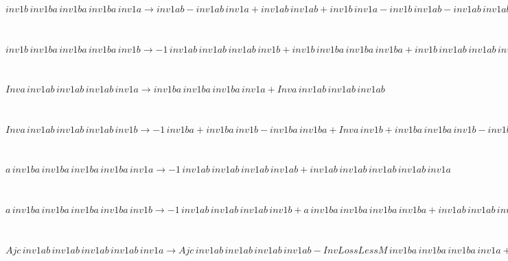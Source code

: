 \begin{minipage}{6in}
$
inv1b\,
 inv1ba\,
 inv1ba\,
 inv1ba\,
 inv1a\rightarrow inv1ab - inv1ab\,
 inv1a + inv1ab\,
 inv1ab + inv1b\,
 inv1a - inv1b\,
 inv1ab - inv1ab\,
 inv1ab\,
 inv1a + inv1ab\,
 inv1ab\,
 inv1ab + inv1b\,
 inv1ab\,
 inv1a - inv1b\,
 inv1ab\,
 inv1ab - inv1ab\,
 inv1ab\,
 inv1ab\,
 inv1a + inv1b\,
 inv1ab\,
 inv1ab\,
 inv1a - inv1b\,
 inv1ab\,
 inv1ab\,
 inv1ab + inv1b\,
 inv1ab\,
 inv1ab\,
 inv1ab\,
 inv1a
$
\end{minipage}\medskip \\
\begin{minipage}{6in}
$
inv1b\,
 inv1ba\,
 inv1ba\,
 inv1ba\,
 inv1b\rightarrow -1\,
 inv1ab\,
 inv1ab\,
 inv1ab\,
 inv1b + inv1b\,
 inv1ba\,
 inv1ba\,
 inv1ba + inv1b\,
 inv1ab\,
 inv1ab\,
 inv1ab\,
 inv1b
$
\end{minipage}\medskip \\
\begin{minipage}{6in}
$
Inva\,
 inv1ab\,
 inv1ab\,
 inv1ab\,
 inv1a\rightarrow inv1ba\,
 inv1ba\,
 inv1ba\,
 inv1a + Inva\,
 inv1ab\,
 inv1ab\,
 inv1ab
$
\end{minipage}\medskip \\
\begin{minipage}{6in}
$
Inva\,
 inv1ab\,
 inv1ab\,
 inv1ab\,
 inv1b\rightarrow -1\,
 inv1ba + inv1ba\,
 inv1b - inv1ba\,
 inv1ba + Inva\,
 inv1b + inv1ba\,
 inv1ba\,
 inv1b - inv1ba\,
 inv1ba\,
 inv1ba + inv1ba\,
 inv1ba\,
 inv1ba\,
 inv1b
$
\end{minipage}\medskip \\
\begin{minipage}{6in}
$
a\,
 inv1ba\,
 inv1ba\,
 inv1ba\,
 inv1ba\,
 inv1a\rightarrow -1\,
 inv1ab\,
 inv1ab\,
 inv1ab\,
 inv1ab + inv1ab\,
 inv1ab\,
 inv1ab\,
 inv1ab\,
 inv1a
$
\end{minipage}\medskip \\
\begin{minipage}{6in}
$
a\,
 inv1ba\,
 inv1ba\,
 inv1ba\,
 inv1ba\,
 inv1b\rightarrow -1\,
 inv1ab\,
 inv1ab\,
 inv1ab\,
 inv1b + a\,
 inv1ba\,
 inv1ba\,
 inv1ba\,
 inv1ba + inv1ab\,
 inv1ab\,
 inv1ab\,
 inv1ab\,
 inv1b
$
\end{minipage}\medskip \\
\begin{minipage}{6in}
$
Ajc\,
 inv1ab\,
 inv1ab\,
 inv1ab\,
 inv1ab\,
 inv1a\rightarrow Ajc\,
 inv1ab\,
 inv1ab\,
 inv1ab\,
 inv1ab - InvLossLessM\,
 inv1ba\,
 inv1ba\,
 inv1ba\,
 inv1a + InvLossLessM\,
 inv1ba\,
 inv1ba\,
 inv1ba\,
 inv1ba\,
 inv1a
$
\end{minipage}\medskip \\
